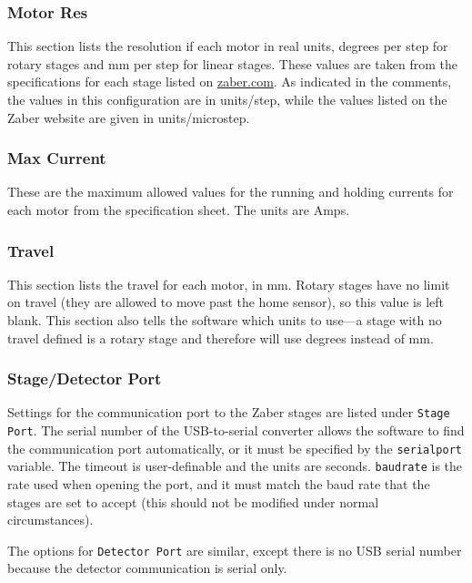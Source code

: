 \subsubsection{Motor Res}

This section lists the resolution if each motor in real units, degrees per step for rotary stages and mm per step for linear stages. These values are taken from the specifications for each stage listed on \url{zaber.com}. As indicated in the comments, the values in this configuration are in units/step, while the values listed on the Zaber website are given in units/microstep.

\subsubsection{Max Current}

These are the maximum allowed values for the running and holding currents for each motor from the specification sheet. The units are Amps.

\subsubsection{Travel}

This section lists the travel for each motor, in mm. Rotary stages have no limit on travel (they are allowed to move past the home sensor), so this value is left blank. This section also tells the software which units to use---a stage with no travel defined is a rotary stage and therefore will use degrees instead of mm.

\subsubsection{Stage/Detector Port}

Settings for the communication port to the Zaber stages are listed under \texttt{Stage Port}. The serial number of the USB-to-serial converter allows the software to find the communication port automatically, or it must be specified by the \texttt{serialport} variable. The timeout is user-definable and the units are seconds. \texttt{baudrate} is the rate used when opening the port, and it must match the baud rate that the stages are set to accept (this should not be modified under normal circumstances).

The options for \texttt{Detector Port} are similar, except there is no USB serial number because the detector communication is serial only.

